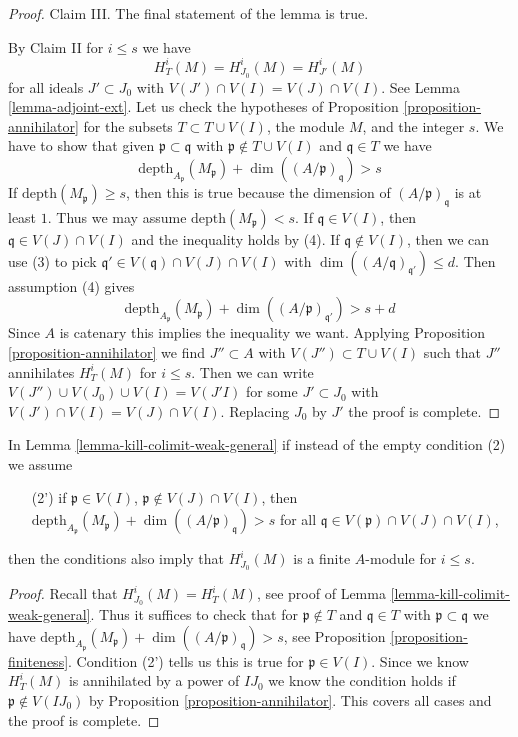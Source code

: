 \begin{proof}
\medskip\noindent
Claim III. The final statement of the lemma is true.

\medskip\noindent
By Claim II for $i \leq s$ we have
$$
H^i_T(M) = H^i_{J_0}(M) = H^i_{J'}(M)
$$
for all ideals $J' \subset J_0$ with $V(J')  \cap V(I) = V(J) \cap V(I)$.
See Lemma \ref{lemma-adjoint-ext}.
Let us check the hypotheses of
Proposition \ref{proposition-annihilator}
for the subsets $T \subset T \cup V(I)$, the module $M$, and the integer $s$.
We have to show that given $\mathfrak p \subset \mathfrak q$
with $\mathfrak p \not \in T \cup V(I)$ and $\mathfrak q \in T$
we have
$$
\text{depth}_{A_\mathfrak p}(M_\mathfrak p) +
\dim((A/\mathfrak p)_\mathfrak q) > s
$$
If $\text{depth}(M_\mathfrak p) \geq s$, then this is true because
the dimension of $(A/\mathfrak p)_\mathfrak q$ is at least $1$.
Thus we may assume $\text{depth}(M_\mathfrak p) < s$.
If $\mathfrak q \in V(I)$, then $\mathfrak q \in V(J) \cap V(I)$
and the inequality holds by (4). If $\mathfrak q \not \in V(I)$,
then we can use (3) to pick
$\mathfrak q' \in V(\mathfrak q) \cap V(J) \cap V(I)$ with
$\dim((A/\mathfrak q)_{\mathfrak q'}) \leq d$.
Then assumption (4) gives
$$
\text{depth}_{A_\mathfrak p}(M_\mathfrak p) +
\dim((A/\mathfrak p)_{\mathfrak q'}) > s + d
$$
Since $A$ is catenary this implies the inequality we want.
Applying Proposition \ref{proposition-annihilator} we
find $J'' \subset A$ with $V(J'') \subset T \cup V(I)$
such that $J''$ annihilates $H^i_T(M)$ for $i \leq s$.
Then we can write $V(J'') \cup V(J_0) \cup V(I) = V(J'I)$
for some $J' \subset J_0$ with $V(J') \cap V(I) = V(J) \cap V(I)$.
Replacing $J_0$ by $J'$ the proof is complete.
\end{proof}

\begin{lemma}
\label{lemma-kill-colimit-general}
In Lemma \ref{lemma-kill-colimit-weak-general} if instead of the empty
condition (2) we assume
\begin{enumerate}
\item[(2')] if $\mathfrak p \in V(I)$, $\mathfrak p \not \in V(J) \cap V(I)$,
then
$\text{depth}_{A_\mathfrak p}(M_\mathfrak p) +
\dim((A/\mathfrak p)_\mathfrak q) > s$
for all $\mathfrak q \in V(\mathfrak p) \cap V(J) \cap V(I)$,
\end{enumerate}
then the conditions also imply that $H^i_{J_0}(M)$ is a finite
$A$-module for $i \leq s$.
\end{lemma}

\begin{proof}
Recall that $H^i_{J_0}(M) = H^i_T(M)$, see proof of
Lemma \ref{lemma-kill-colimit-weak-general}. Thus it suffices to
check that for $\mathfrak p \not \in T$ and $\mathfrak q \in T$
with $\mathfrak p \subset \mathfrak q$ we have
$\text{depth}_{A_\mathfrak p}(M_\mathfrak p) +
\dim((A/\mathfrak p)_\mathfrak q) > s$, see
Proposition \ref{proposition-finiteness}.
Condition (2') tells us this is true for $\mathfrak p \in V(I)$.
Since we know $H^i_T(M)$ is annihilated by a power of $IJ_0$
we know the condition holds if $\mathfrak p \not \in V(IJ_0)$
by Proposition \ref{proposition-annihilator}.
This covers all cases and the proof is complete.
\end{proof}

